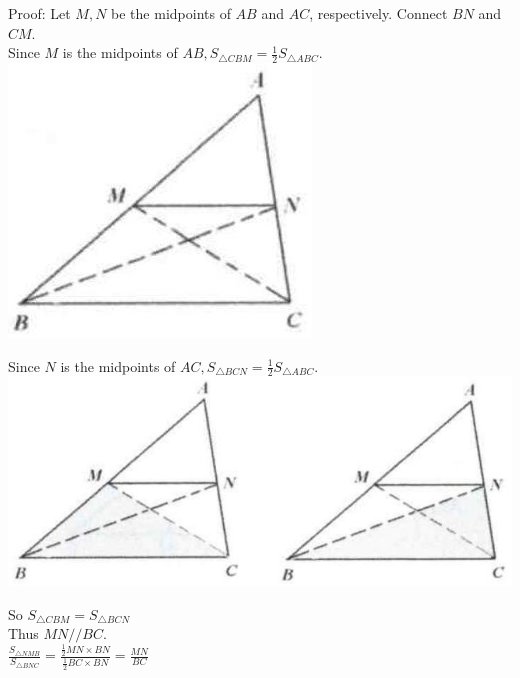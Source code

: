 \documentclass[10pt]{article}
\begin{document}
Proof:
Let \(M, N\) be the midpoints of \(A B\) and \(A C\), respectively. Connect \(B N\) and \(C M\).\\
Since \(M\) is the midpoints of \(A B, S_{\triangle C B M}=\frac{1}{2} S_{\triangle A B C}\).\\
\includegraphics[max width=\textwidth, center]{2025_04_17_97bc1f7e44d93c271a88g-032}

Since \(N\) is the midpoints of \(A C, S_{\triangle B C N}=\frac{1}{2} S_{\triangle A B C}\).\\
\includegraphics[max width=\textwidth, center]{2025_04_17_97bc1f7e44d93c271a88g-032(1)}

So \(S_{\triangle C B M}=S_{\triangle B C N}\)\\
Thus \(M N / / B C\).\\
\(\frac{S_{\triangle N M B}}{S_{\triangle B N C}}=\frac{\frac{1}{2} M N \times B N}{\frac{1}{2} B C \times B N}=\frac{M N}{B C}\)
\end{document}
